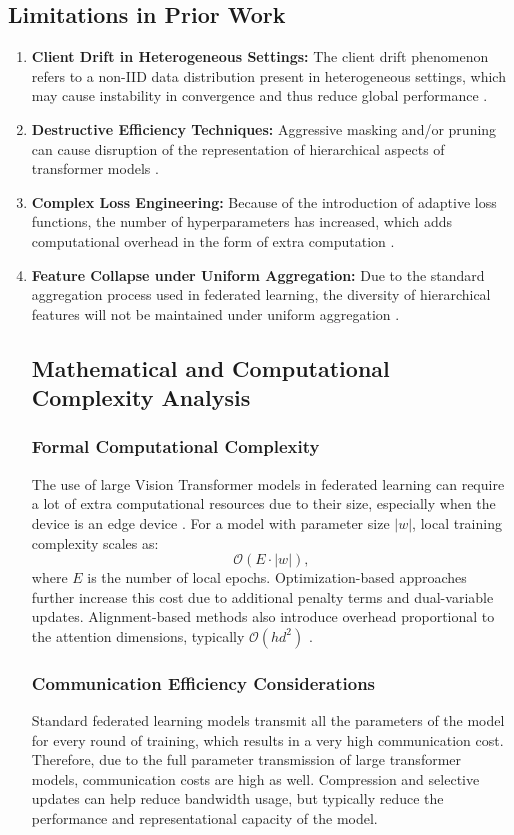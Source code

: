 \documentclass[utf8]{FrontiersinHarvard} %
\begin{document}
\subsection{Limitations in Prior Work}
\begin{enumerate}
\item \textbf{Client Drift in Heterogeneous Settings:} The client drift phenomenon refers to a non-IID data distribution present in heterogeneous settings, which may cause instability in convergence and thus reduce global performance \citep{Zhu2025}.
\item \textbf{Destructive Efficiency Techniques:} Aggressive masking and/or pruning can cause disruption of the representation of hierarchical aspects of transformer models \citep{Wu2024}.

\item \textbf{Complex Loss Engineering:} Because of the introduction of adaptive loss functions, the number of hyperparameters has increased, which adds computational overhead in the form of extra computation \citep{Zhao2025}.

\item \textbf{Feature Collapse under Uniform Aggregation:} Due to the standard aggregation process used in federated learning, the diversity of hierarchical features will not be maintained under uniform aggregation \citep{Darzi2024}.

\subsection{Mathematical and Computational Complexity Analysis}
\subsubsection{Formal Computational Complexity}
The use of large Vision Transformer models in federated learning can require a lot of extra computational resources due to their size, especially when the device is an edge device \citep{Wu2024}. For a model with parameter size $|w|$, local training complexity scales as:
\begin{equation}
\mathcal{O}(E \cdot |w|),
\end{equation}
where $E$ is the number of local epochs. Optimization-based approaches further increase this cost due to additional penalty terms and dual-variable updates. Alignment-based methods also introduce overhead proportional to the attention dimensions, typically $\mathcal{O}(h d^2)$ \citep{Darzi2024}.
\subsubsection{Communication Efficiency Considerations}
Standard federated learning models transmit all the parameters of the model for every round of training, which results in a very high communication cost. Therefore, due to the full parameter transmission of large transformer models, communication costs are high as well. Compression and selective updates can help reduce bandwidth usage, but typically reduce the performance and representational capacity of the model.

\end{enumerate}
\end{document}
